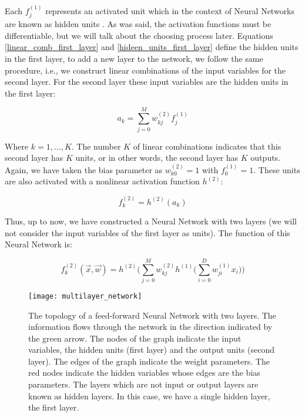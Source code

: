 Each $f_{j}^{(1)}$ represents an activated unit which in the context of Neural Networks are known as hidden units \cite{machine_bishop}. As was said, the activation functions must be differentiable, but we will talk about the choosing process later. Equations \ref{linear_comb_first_layer} and \ref{hideen_units_first_layer} define the hidden units in the first layer, to add a new layer to the network, we follow the same procedure, i.e., we construct linear combinations of the input variables for the second layer. For the second layer these input variables are the hidden units in the first layer:

\begin{equation}
\label{linear_comb_second_layer}
	 a_{k}=\sum_{j=0}^{M} w_{kj}^{(2)}f_{j}^{(1)}
\end{equation}

Where $k=1,...,K$. The number $K$ of linear combinations indicates that this second layer has $K$ units, or in other words, the second layer has $K$ outputs. Again, we have taken the bias parameter as $w_{k0}^{(2)}=1$ with $f_{0}^{(1)}=1$. These units are also activated with a nonlinear activation function $h^{(2)}$:

\begin{equation}
\label{hideen_units_second_layer}
	 f_{k}^{(2)}=h^{(2)}(a_{k})
\end{equation}

Thus, up to now, we have constructed a Neural Network with two layers (we will not consider the input variables of the first layer as units). The function of this Neural Network is:

\begin{equation}
\label{NN_feed_forward}
	 f_{k}^{(2)}(\vec{x},\vec{w})=h^{(2)} \bigg( \sum_{j=0}^{M} w_{kj}^{(2)} h^{(1)} \bigg( \sum_{i=0}^{D} w_{ji}^{(1)}x_{i} \bigg) \bigg)
\end{equation}

\begin{figure}
\centering
\texttt{[image: multilayer\_network]}
\caption[The topology of a feed-forward Neural Network with two layers.]{The topology of a feed-forward Neural Network with two layers. The information flows through the network in the direction indicated by the green arrow. The nodes of the graph indicate the input variables, the hidden units (first layer) and the output units (second layer). The edges of the graph indicate the weight parameters. The red nodes indicate the hidden variables whose edges are the bias parameters. The layers which are not input or output layers are known as hidden layers. In this case, we have a single hidden layer, the first layer.}
\label{fig:multilayer_network}
\end{figure}

